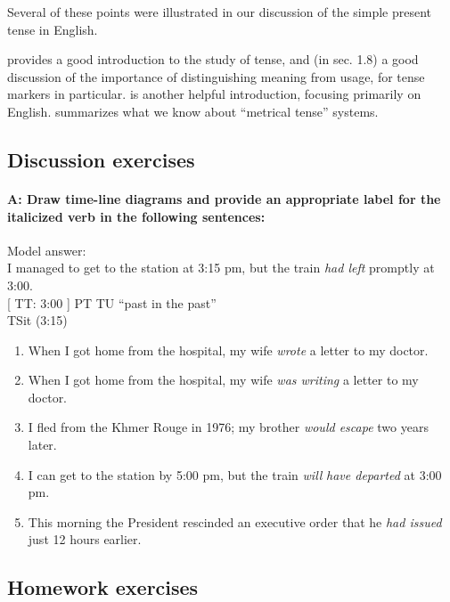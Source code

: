 Several of these points were illustrated in our discussion of the simple present tense in English.



\furtherreading



\citet[ch. 1]{Comrie1985} provides a good introduction to the study of tense, and (in sec. 1.8) a good discussion of the importance of distinguishing meaning from usage, for tense markers in particular. \citet{Michaelis2006} is another helpful introduction, focusing primarily on English. \citet{Botne2012} summarizes what we know about “metrical tense” systems. 


\subsection*{Discussion exercises}

\paragraph*{A: Draw time-line diagrams and provide an appropriate label for the italicized verb in the following sentences:}

\textsf{Model answer:\\
I managed to get to the station at 3:15 pm, but the train} \textsf{\textit{had left}}\textsf{ promptly at 3:00.}\\
      {}[  TT: 3:00  ]  PT  TU     “past in the past”\\
         \textbf{{\textbar}}TSit\textbf{{\textbar}}    (3:15)

\begin{enumerate}[label=\alph*.]
\item When I got home from the hospital, my wife \textit{wrote} a letter to my doctor.
\item When I got home from the hospital, my wife \textit{was writing} a letter to my doctor.
\item I fled from the Khmer Rouge in 1976; my brother \textit{would escape} two years later.
\item I can get to the station by 5:00 pm, but the train \textit{will} \textit{have departed} at 3:00 pm.
\item This morning the President rescinded an executive order that he \textit{had issued} just 12 hours earlier.
\end{enumerate}

\subsection*{Homework exercises}

